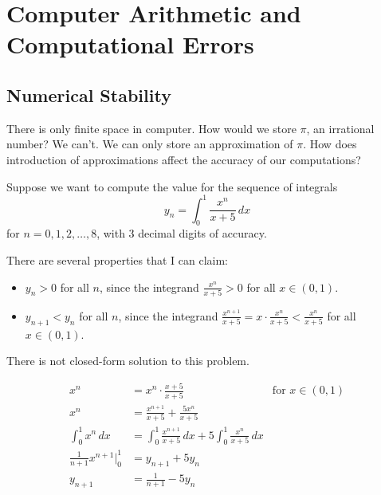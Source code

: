 \chapter{Computer Arithmetic and Computational Errors}

\section{Numerical Stability}

There is only finite space in computer. How would we store \( \pi \), an irrational number? We can't. We can only store an approximation of \( \pi \). How does introduction of approximations affect the accuracy of our computations?

\begin{example}
    Suppose we want to compute the value for the sequence of integrals \[
        y_n = \int_0^1 \frac{x^n}{x + 5} \, dx
    \] for \( n = 0, 1, 2, \ldots, 8 \), with 3 decimal digits of accuracy.

    There are several properties that I can claim:

    \begin{itemize}
        \item \( y_n > 0 \) for all \( n \), since the integrand \( \frac{x^n}{x + 5} > 0 \) for all \( x \in (0, 1) \).
        \item \( y_{n+1} < y_n \) for all \( n \), since the integrand \( \frac{x^{n+1}}{x + 5}
              = x \cdot \frac{x^n}{x + 5} < \frac{x^n}{x + 5} \) for all \( x \in (0, 1) \).
    \end{itemize}

    There is not closed-form solution to this problem.

    \begin{align*}
        x^n
         & = x^n \cdot \frac{x + 5}{x + 5}
         & \text{for } x \in (0, 1)                                                  \\
        x^n
         & = \frac{x^{n+1}}{x + 5} + \frac{5x^n}{x + 5}                              \\
        \int_0^1 x^n \,dx
         & = \int_0^1 \frac{x^{n+1}}{x + 5} \,dx + 5 \int_0^1 \frac{x^n}{x + 5} \,dx \\
        \frac{1}{n + 1} x^{n+1} \Big|_0^1
         & = y_{n+1} + 5 y_n                                                         \\
        y_{n+1}
         & = \frac{1}{n + 1} - 5 y_n
    \end{align*}


\end{example}
